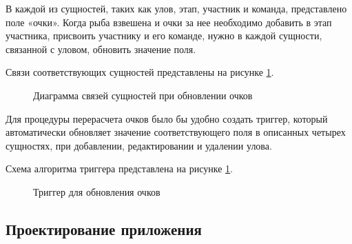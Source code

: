 В каждой из сущностей, таких как улов, этап, участник и команда, представлено поле «очки». Когда рыба взвешена и очки за нее необходимо добавить в этап участника, присвоить участнику и его команде, нужно в каждой сущности, связанной с уловом, обновить значение поля. 

Связи соответствующих сущностей представлены на рисунке \ref{fig:score}.

\begin{figure}[ht!]
	\caption{Диаграмма связей сущностей при обновлении очков}
	\label{fig:score}
\end{figure}

Для процедуры перерасчета очков было бы удобно создать триггер, который автоматически обновляет значение соответствующего поля в описанных четырех сущностях, при добавлении, редактировании и удалении улова.  

Схема алгоритма триггера представлена на рисунке \ref{fig:score}.

\begin{figure}[ht!]
	\caption{Триггер для обновления очков}
	\label{fig:trigger}
\end{figure}

\subsection{Проектирование приложения}

